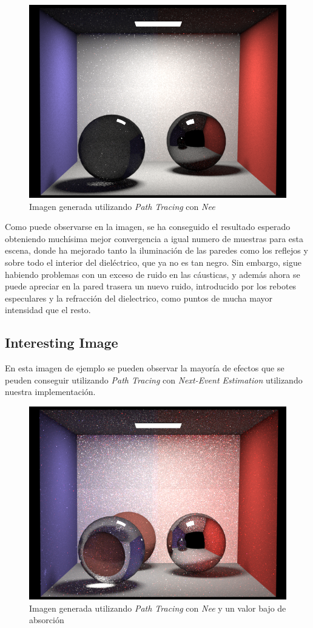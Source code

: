 \documentclass[10pt,oneside,a4paper]{article}
\begin{document}
\begin{figure}[h]
\centering
\includegraphics[width=.6\linewidth]{images/cbox_pathNee_512.png}
\caption{Imagen generada utilizando \textit{Path Tracing} con \textit{Nee}}
\label{fig:disp}
\end{figure}

Como puede observarse en la imagen, se ha conseguido el resultado esperado obteniendo muchísima mejor convergencia a igual numero de muestras para esta escena, donde ha mejorado tanto la iluminación de las paredes como los reflejos y sobre todo el interior del dieléctrico, que ya no es tan negro. Sin embargo, sigue habiendo problemas con un exceso de ruido en las cáusticas, y además ahora se puede apreciar en la pared trasera un nuevo ruido, introducido por los rebotes especulares y la refracción del dielectrico, como puntos de mucha mayor intensidad que el resto.
 
 \subsection{Interesting Image}
En esta imagen de ejemplo se pueden observar la mayoría de efectos que se peuden conseguir utilizando \textit{Path Tracing} con \textit{Next-Event Estimation} utilizando nuestra implementación.

\begin{figure}[h]
\centering
\includegraphics[width=.6\linewidth]{images/cbox_interesting_nee_512.png}
\caption{Imagen generada utilizando \textit{Path Tracing} con \textit{Nee} y un valor bajo de absorción}
\label{fig:disp}
\end{figure}
\end{document}
